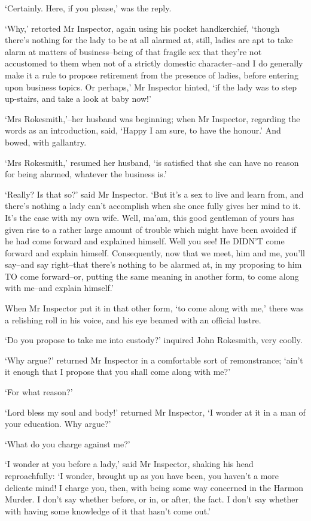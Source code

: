 ‘Certainly. Here, if you please,’ was the reply.

‘Why,’ retorted Mr Inspector, again using his pocket handkerchief,
‘though there’s nothing for the lady to be at all alarmed at, still,
ladies are apt to take alarm at matters of business--being of that
fragile sex that they’re not accustomed to them when not of a strictly
domestic character--and I do generally make it a rule to propose
retirement from the presence of ladies, before entering upon business
topics. Or perhaps,’ Mr Inspector hinted, ‘if the lady was to step
up-stairs, and take a look at baby now!’

‘Mrs Rokesmith,’--her husband was beginning; when Mr Inspector,
regarding the words as an introduction, said, ‘Happy I am sure, to have
the honour.’ And bowed, with gallantry.

‘Mrs Rokesmith,’ resumed her husband, ‘is satisfied that she can have no
reason for being alarmed, whatever the business is.’

‘Really? Is that so?’ said Mr Inspector. ‘But it’s a sex to live and
learn from, and there’s nothing a lady can’t accomplish when she once
fully gives her mind to it. It’s the case with my own wife. Well, ma’am,
this good gentleman of yours has given rise to a rather large amount
of trouble which might have been avoided if he had come forward and
explained himself. Well you see! He DIDN’T come forward and explain
himself. Consequently, now that we meet, him and me, you’ll say--and say
right--that there’s nothing to be alarmed at, in my proposing to him
TO come forward--or, putting the same meaning in another form, to come
along with me--and explain himself.’

When Mr Inspector put it in that other form, ‘to come along with me,’
there was a relishing roll in his voice, and his eye beamed with an
official lustre.

‘Do you propose to take me into custody?’ inquired John Rokesmith, very
coolly.

‘Why argue?’ returned Mr Inspector in a comfortable sort of
remonstrance; ‘ain’t it enough that I propose that you shall come along
with me?’

‘For what reason?’

‘Lord bless my soul and body!’ returned Mr Inspector, ‘I wonder at it in
a man of your education. Why argue?’

‘What do you charge against me?’

‘I wonder at you before a lady,’ said Mr Inspector, shaking his head
reproachfully: ‘I wonder, brought up as you have been, you haven’t a
more delicate mind! I charge you, then, with being some way concerned
in the Harmon Murder. I don’t say whether before, or in, or after, the
fact. I don’t say whether with having some knowledge of it that hasn’t
come out.’

